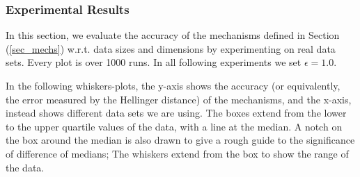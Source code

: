 \documentclass{article}
\begin{document}
\subsubsection{Experimental Results}
\label{subsec_vs_variables}

In this section, we evaluate the accuracy of the mechanisms defined in
Section (\ref{sec_mechs}) w.r.t. data sizes and dimensions by experimenting on real data sets.
Every plot is over 1000 runs. In all following experiments we set
$\epsilon = 1.0$.

\noindent In the following whiskers-plots, the y-axis shows the
accuracy (or equivalently, the error measured by the Hellinger distance) of the mechanisms, and the x-axis, instead shows
different data sets we are using. The boxes extend from the lower to the upper quartile values
of the data, with a line at the median. A notch on the box around the
median is also drawn to give a rough guide to the significance of
difference of medians; The whiskers extend from the box to show the
range of the data. 




\end{document}
